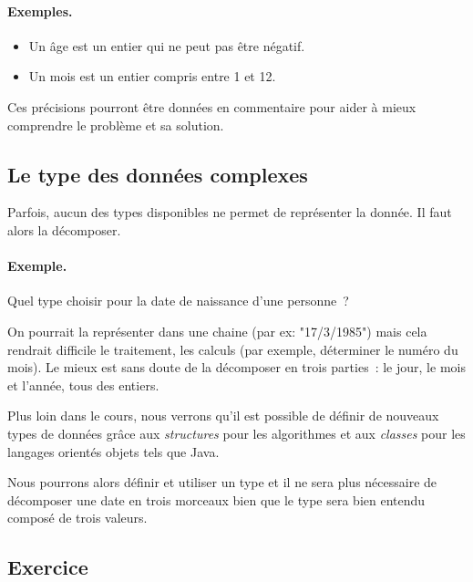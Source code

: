 			\begin{Emphase}
				\paragraph{Exemples.}	
				\begin{itemize} 
				\item Un âge est un entier qui ne peut pas être négatif.
				\item Un mois est un entier compris entre 1 et 12.
				\end{itemize}
			\end{Emphase}
			
			Ces précisions pourront être données en commentaire
			pour aider à mieux comprendre le problème et sa solution.
	
		\subsection{Le type des données complexes}
		
			Parfois, aucun des types disponibles ne permet de représenter 
			la donnée.
			Il faut alors la décomposer.
			
			\begin{Emphase}
				\paragraph{Exemple.}	
				Quel type choisir 
				pour la date de naissance d’une personne~?
				
				On pourrait la représenter dans une chaine 
				(par ex: "17/3/1985")
				mais cela rendrait difficile le traitement, les calculs
				(par exemple, déterminer le numéro du mois).
				Le mieux est sans doute de la décomposer en trois parties~: 
				le jour, le mois et l’année, tous des entiers.
			\end{Emphase}
			
			Plus loin dans le cours,
			nous verrons qu’il est possible de définir de nouveaux
			types de données grâce aux \emph{structures} pour les algorithmes et 
			aux \emph{classes} pour les langages orientés objets tels que Java. 
			
			Nous pourrons alors définir et utiliser un type 
			et il ne sera plus nécessaire de décomposer une date en trois
			morceaux bien que le type sera bien entendu composé de trois valeurs.

	
		\subsection{Exercice}
		
